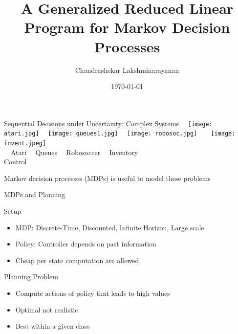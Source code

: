 \documentclass[handout,10pt]{beamer}
\title{A Generalized Reduced Linear Program for Markov Decision Processes}
\date{\today}
\author{Chandrashekar Lakshminarayanan}
\institute{Reinforcement Learning \& Artificial Intelligence Group,\\University of Alberta}
\begin{document}
\maketitle



\begin{frame}[fragile]{Sequential Decisions under Uncertainty: Complex Systems}
$\mbox{ }$
\texttt{[image: atari.jpg]}
$\mbox{ }$
\texttt{[image: queues1.jpg]}
$\mbox{ }$
\texttt{[image: robosoc.jpg]}
$\mbox{ }$$\mbox{ }$
\texttt{[image: invent.jpeg]}
$\mbox{ }$\\
$\mbox{ }$
\quad Atari\quad\quad\quad\quad
$\mbox{ }$
Queues\quad\quad\quad\quad
$\mbox{ }$
Robosoccer\quad\quad
$\mbox{ }$
Inventory
$\mbox{ }$\\
\quad\quad\quad\quad\quad\quad\quad
\quad\quad\quad\quad\quad\quad\quad
\quad\quad\quad\quad\quad\quad\quad
\quad\quad\quad
Control
\begin{block}{}
Markov decision processes (MDPs) is useful to model these problems
\end{block}

\end{frame}


\begin{frame}[fragile]{MDPs and Planning}
\begin{block}{Setup}
\begin{itemize}
\item MDP: Discrete-Time, Discounted, Infinite Horizon, Large scale
\item Policy: Controller depends on past information
\item Cheap per state computation are allowed
\end{itemize}
\end{block}
\begin{block}{Planning Problem}
\begin{itemize}
\item Compute actions of policy that leads to high values
\item Optimal not realistic
\item Best within a given class
\end{itemize}
\end{block}

\end{frame}
\end{document}
